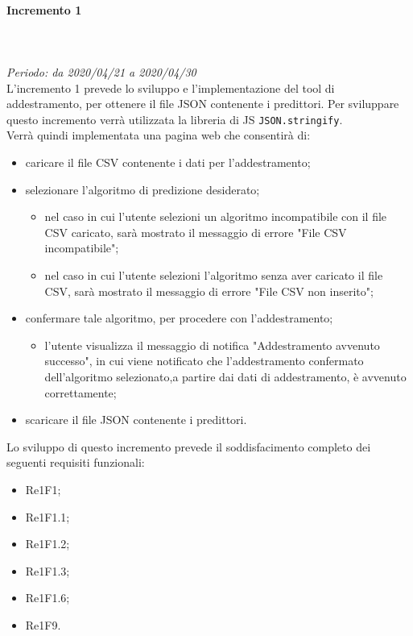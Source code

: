 \paragraph{Incremento 1}\mbox{} \\ \mbox{} \\ 
\textit{Periodo: da 2020/04/21 a 2020/04/30}\\
L’incremento 1 prevede lo sviluppo e l’implementazione del tool di addestramento, per ottenere il file JSON contenente i predittori. Per sviluppare questo incremento verrà utilizzata la libreria di JS \texttt{JSON.stringify}. \\
Verrà quindi implementata una pagina web che consentirà di: \begin{itemize}
\item caricare il file CSV contenente i dati per l'addestramento;
\item selezionare l'algoritmo di predizione desiderato;
\begin{itemize}
\item nel caso in cui l’utente selezioni un algoritmo incompatibile con il file CSV caricato, sarà mostrato il messaggio di errore "File CSV incompatibile";
\item nel caso in cui l'utente selezioni l'algoritmo senza aver caricato il file CSV, sarà mostrato il messaggio di errore "File CSV non inserito";
\end{itemize}
\item confermare tale algoritmo, per procedere con l'addestramento;
\begin{itemize}
\item l’utente visualizza il messaggio di notifica "Addestramento avvenuto successo", in cui viene notificato che l’addestramento confermato dell’algoritmo selezionato,a partire dai dati di addestramento, è avvenuto correttamente;
\end{itemize}
\item scaricare il file JSON contenente i predittori.
\end{itemize}
Lo sviluppo di questo incremento prevede il soddisfacimento completo dei seguenti requisiti funzionali:
\begin{itemize}
\item Re1F1;
\item Re1F1.1;
\item Re1F1.2;
\item Re1F1.3;
\item Re1F1.6;
\item Re1F9.
\end{itemize}
